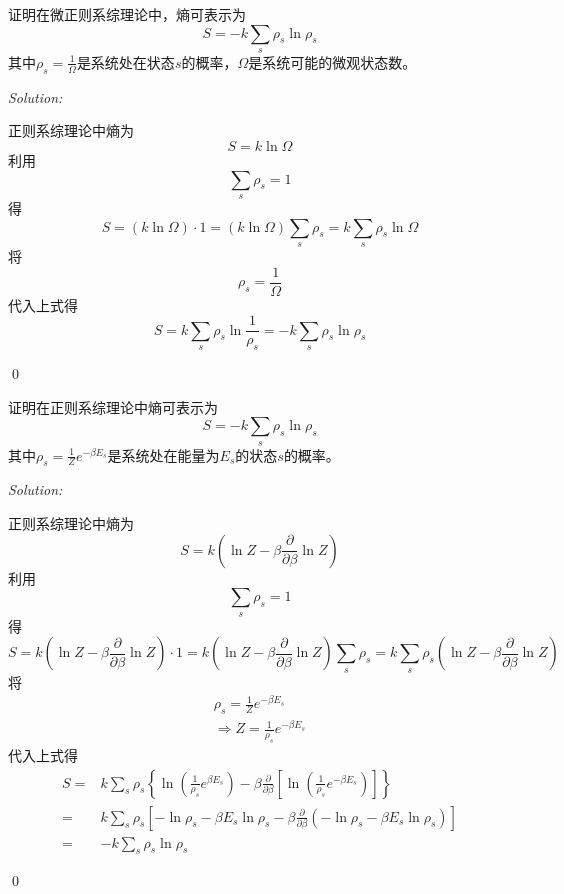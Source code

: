 \documentclass[12pt,a4paper]{article}
\newenvironment{problem}[2][Problem]{\begin{trivlist}
\item[\hskip \labelsep {\bfseries #1}\hskip \labelsep {\bfseries #2.}]}{\end{trivlist}}
\newenvironment{sol}
    {\emph{Solution:}
    }
    {
    \qed
    }
\begin{document}
\begin{problem}{9.1}
证明在微正则系综理论中，熵可表示为
\[
S=-k\sum_s\rho_s\ln\rho_s
\]
其中$\rho_s=\frac{1}{\Omega}$是系统处在状态$s$的概率，$\Omega$是系统可能的微观状态数。
\end{problem}
\begin{sol}
正则系综理论中熵为
\begin{equation}
S=k\ln\Omega
\end{equation}
利用
\begin{equation}
\sum_s\rho_s=1
\end{equation}
得
\begin{equation}
S=(k\ln\Omega)\cdot1=(k\ln\Omega)\sum_s\rho_s=k\sum_s\rho_s\ln\Omega
\end{equation}
将
\begin{equation}
\rho_s=\frac{1}{\Omega}
\end{equation}
代入上式得
\begin{equation}
S=k\sum_s\rho_s\ln\frac{1}{\rho_s}=-k\sum_s\rho_s\ln\rho_s
\end{equation}
\end{sol}

\begin{problem}{9.2}
证明在正则系综理论中熵可表示为
\[
S=-k\sum_s\rho_s\ln\rho_s
\]
其中$\rho_s=\frac{1}{Z}e^{-\beta E_s}$是系统处在能量为$E_s$的状态$s$的概率。
\end{problem}
\begin{sol}
正则系综理论中熵为
\begin{equation}
S=k\left(\ln Z-\beta\frac{\partial}{\partial\beta}\ln Z\right)
\end{equation}
利用
\begin{equation}
\sum_s\rho_s=1
\end{equation}
得
\begin{equation}
S=k\left(\ln Z-\beta\frac{\partial}{\partial\beta}\ln Z\right)\cdot1=k\left(\ln Z-\beta\frac{\partial}{\partial\beta}\ln Z\right)\sum_s\rho_s=k\sum_s\rho_s\left(\ln Z-\beta\frac{\partial}{\partial\beta}\ln Z\right)
\end{equation}
将
\begin{gather}
\rho_s=\frac{1}{Z}e^{-\beta E_s}\\
\Longrightarrow Z=\frac{1}{\rho_s}e^{-\beta E_s}
\end{gather}
代入上式得
\begin{align}
\nonumber S=&k\sum_s\rho_s\left\{\ln\left(\frac{1}{\rho_s}e^{\beta E_s}\right)-\beta\frac{\partial}{\partial\beta}\left[\ln\left(\frac{1}{\rho_s}e^{-\beta E_s}\right)\right]\right\}\\
\nonumber=&k\sum_s\rho_s\left[-\ln\rho_s-\beta E_s\ln\rho_s-\beta\frac{\partial}{\partial\beta}(-\ln\rho_s-\beta E_s\ln\rho_s)\right]\\
=&-k\sum_s\rho_s\ln\rho_s
\end{align}
\end{sol}
\end{document}
